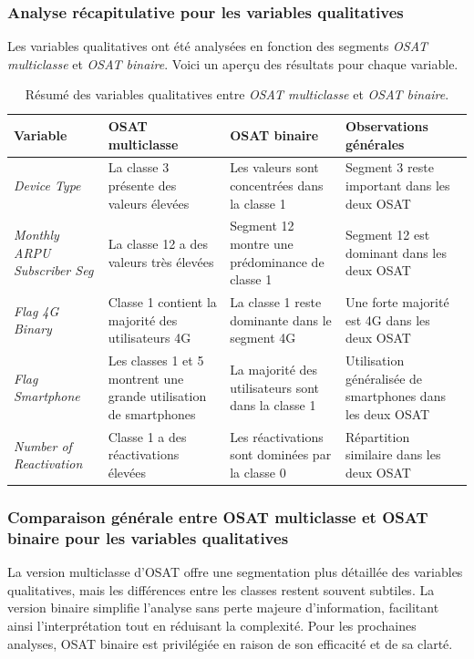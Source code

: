 \subsubsection*{Analyse récapitulative pour les variables qualitatives}

Les variables qualitatives ont été analysées en fonction des segments \textit{OSAT multiclasse} et \textit{OSAT binaire}. Voici un aperçu des résultats pour chaque variable.

\begin{table}[H]
    \centering
    \begin{tabular}{|p{3.5cm}|p{3.5cm}|p{3.5cm}|p{3.5cm}|} 
    \hline
    \textbf{Variable} & \textbf{OSAT multiclasse} & \textbf{OSAT binaire} & \textbf{Observations générales} \\ 
    \hline
    \textit{Device Type} & 
    La classe 3 présente des valeurs élevées & 
    Les valeurs sont concentrées dans la classe 1 & 
    Segment 3 reste important dans les deux OSAT \\ 
    \hline
    \textit{Monthly ARPU Subscriber Seg} & 
    La classe 12 a des valeurs très élevées & 
    Segment 12 montre une prédominance de classe 1 & 
    Segment 12 est dominant dans les deux OSAT \\ 
    \hline
    \textit{Flag 4G Binary} & 
    Classe 1 contient la majorité des utilisateurs 4G & 
    La classe 1 reste dominante dans le segment 4G & 
    Une forte majorité est 4G dans les deux OSAT \\ 
    \hline
    \textit{Flag Smartphone} & 
    Les classes 1 et 5 montrent une grande utilisation de smartphones & 
    La majorité des utilisateurs sont dans la classe 1 & 
    Utilisation généralisée de smartphones dans les deux OSAT \\ 
    \hline
    \textit{Number of Reactivation} & 
    Classe 1 a des réactivations élevées & 
    Les réactivations sont dominées par la classe 0 & 
    Répartition similaire dans les deux OSAT \\ 
    \hline
    \end{tabular}
    \caption{Résumé des variables qualitatives entre \textit{OSAT multiclasse} et \textit{OSAT binaire}.}
\end{table}

\subsubsection*{Comparaison générale entre OSAT multiclasse et OSAT binaire pour les variables qualitatives}
La version multiclasse d'OSAT offre une segmentation plus détaillée des variables qualitatives, mais les différences entre les classes restent souvent subtiles. La version binaire simplifie l'analyse sans perte majeure d'information, facilitant ainsi l'interprétation tout en réduisant la complexité. Pour les prochaines analyses, OSAT binaire est privilégiée en raison de son efficacité et de sa clarté.

